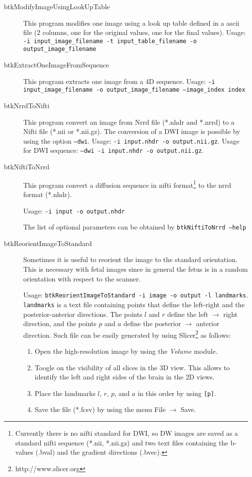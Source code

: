 \begin{description}

\item[btkModifyImageUsingLookUpTable] This program modifies one image using a
look up table defined in a ascii file (2 columns, one for the original values,
one for the final values). Usage: \texttt{-i input\_image\_filename -t
input\_table\_filename -o output\_image\_filename}
  
\item[btkExtractOneImageFromSequence] This program extracts one image from a 4D sequence. Usage: \texttt{-i input\_image\_filename -o output\_image\_filename --image\_index index}

\item[btkNrrdToNifti] This program convert an image from Nrrd file (*.nhdr and *.nrrd) to a Nifti file (*.nii or *.nii.gz). The conversion of a DWI image is possible by using the option \texttt{--dwi}. Usage: \texttt{-i input.nhdr -o output.nii.gz}. Usage for DWI sequence: \texttt{--dwi -i input.nhdr -o output.nii.gz}.

\item[btkNiftiToNrrd] This program convert a diffusion sequence in nifti
format\footnote{Currently there is no nifti standard for DWI, so DW images are
saved as a standard nifti sequence (*.nii, *.nii.gz) and two text files
containing the b-values (.bval) and the gradient directions (.bvec).}  to the
nrrd format (*.nhdr). 

Usage: \texttt{-i input -o output.nhdr}

The list of optional parameters can be obtained by \texttt{btkNiftiToNrrd
--help}

\item[btkReorientImageToStandard] Sometimes it is useful
to reorient the image to the standard orientation. This is necessary with fetal
images since in general the fetus is in a random orientation with respect to the
scanner.

Usage: \texttt{btkReorientImageToStandard -i image -o output -l landmarks}.
\texttt{landmarks} is a text file containing points that define the left-right
and the posterior-anterior directions. The points $l$ and $r$ define the left
$\rightarrow$ right direction, and the points $p$ and $a$ define the posterior
$\rightarrow$ anterior direction. Such file can be easily generated by using
Slicer\footnote{http://www.slicer.org} as follows:

\begin{enumerate}
\item Open the high-resolution image by using the \textit{Volume} module.
\item Toogle on the visibility of all slices in the 3D view. This allows to
identify the left and right sides of the brain in the 2D views.
\item Place the landmarks $l$, $r$, $p$, and $a$ in this order by using
\texttt{[p]}.
\item Save the file (*.fcsv) by using the menu File $\rightarrow$ Save.
\end{enumerate}



\end{description}
